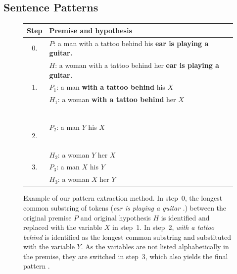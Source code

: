 


\subsection{Sentence Patterns}
\label{examined-sentences}

\begin{figure}[hb!]
\begin{tabular}{cl}
\toprule
\textbf{Step} & \textbf{Premise and hypothesis} \\ 
\midrule
0. & $P$: a man with a tattoo behind his \textbf{ear is playing a guitar.} \\
   & $H$: a woman with a tattoo behind her \textbf{ear is playing a guitar.} \\ 
   
1. & $P_1$: a man \textbf{with a tattoo behind} his $X$ \\
   & $H_1$: a woman \textbf{with a tattoo behind} her $X$ \\ \
   
2. & $P_2$: a man $Y$ his $X$ \\
   & $H_2$: a woman $Y$ her $X$ \\ 
   
3. & $P_3$: a man $X$ his $Y$ \\
   & $H_3$: a woman $X$ her $Y$ \\ 
\bottomrule
\end{tabular}
\caption{Example of our pattern extraction method. In step~0, the longest common substring of tokens (\textit{ear is playing a guitar .}) between the original premise $P$ and original hypothesis $H$ is identified and replaced with the variable $X$ in step~1. In step~2, \textit{with a tattoo behind} is identified as the longest common substring and substituted with the variable $Y$. As the variables are not listed alphabetically in the premise, they are switched in step~3, which also yields the final pattern .}
\label{tab:howisitdone}
\end{figure}


